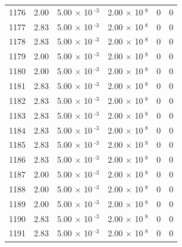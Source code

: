 \documentclass[a4paper,11pt]{article}
\begin{document}
\begin{center}
\begin{longtable}{|R{1.5cm}|R{2.4cm}|R{2.4cm}|R{2.4cm}|R{2.4cm}|R{2.4cm}|}
 1176 &   2.00  &         5.00 $\times$ 10$^{\text{          -3}}$  &         2.00 $\times$ 10$^{\text{           8}}$  & 0  & 0 \\
 1177 &   2.83  &         5.00 $\times$ 10$^{\text{          -3}}$  &         2.00 $\times$ 10$^{\text{           8}}$  & 0  & 0 \\
 1178 &   2.83  &         5.00 $\times$ 10$^{\text{          -3}}$  &         2.00 $\times$ 10$^{\text{           8}}$  & 0  & 0 \\
 1179 &   2.00  &         5.00 $\times$ 10$^{\text{          -3}}$  &         2.00 $\times$ 10$^{\text{           8}}$  & 0  & 0 \\
 1180 &   2.00  &         5.00 $\times$ 10$^{\text{          -3}}$  &         2.00 $\times$ 10$^{\text{           8}}$  & 0  & 0 \\
 1181 &   2.83  &         5.00 $\times$ 10$^{\text{          -3}}$  &         2.00 $\times$ 10$^{\text{           8}}$  & 0  & 0 \\
 1182 &   2.83  &         5.00 $\times$ 10$^{\text{          -3}}$  &         2.00 $\times$ 10$^{\text{           8}}$  & 0  & 0 \\
 1183 &   2.83  &         5.00 $\times$ 10$^{\text{          -3}}$  &         2.00 $\times$ 10$^{\text{           8}}$  & 0  & 0 \\
 1184 &   2.83  &         5.00 $\times$ 10$^{\text{          -3}}$  &         2.00 $\times$ 10$^{\text{           8}}$  & 0  & 0 \\
 1185 &   2.83  &         5.00 $\times$ 10$^{\text{          -3}}$  &         2.00 $\times$ 10$^{\text{           8}}$  & 0  & 0 \\
 1186 &   2.83  &         5.00 $\times$ 10$^{\text{          -3}}$  &         2.00 $\times$ 10$^{\text{           8}}$  & 0  & 0 \\
 1187 &   2.00  &         5.00 $\times$ 10$^{\text{          -3}}$  &         2.00 $\times$ 10$^{\text{           8}}$  & 0  & 0 \\
 1188 &   2.00  &         5.00 $\times$ 10$^{\text{          -3}}$  &         2.00 $\times$ 10$^{\text{           8}}$  & 0  & 0 \\
 1189 &   2.00  &         5.00 $\times$ 10$^{\text{          -3}}$  &         2.00 $\times$ 10$^{\text{           8}}$  & 0  & 0 \\
 1190 &   2.83  &         5.00 $\times$ 10$^{\text{          -3}}$  &         2.00 $\times$ 10$^{\text{           8}}$  & 0  & 0 \\
 1191 &   2.83  &         5.00 $\times$ 10$^{\text{          -3}}$  &         2.00 $\times$ 10$^{\text{           8}}$  & 0  & 0 \\

\end{longtable}
\end{center}
\end{document}
